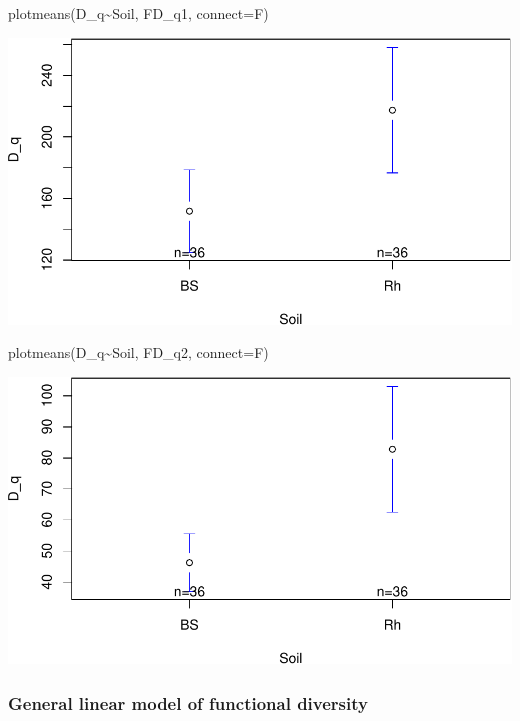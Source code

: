\documentclass[]{interact}
\theoremstyle{plain}%
\theoremstyle{definition}
\theoremstyle{remark}
\newenvironment{Shaded}{\begin{snugshade}}{\end{snugshade}}
\newcommand{\AttributeTok}[1]{\textcolor[rgb]{0.77,0.63,0.00}{#1}}
\newcommand{\FunctionTok}[1]{\textcolor[rgb]{0.00,0.00,0.00}{#1}}
\newcommand{\NormalTok}[1]{#1}
\newcommand{\SpecialCharTok}[1]{\textcolor[rgb]{0.00,0.00,0.00}{#1}}
\begin{document}
\begin{Shaded}
\begin{Highlighting}[]
\FunctionTok{plotmeans}\NormalTok{(D\_q}\SpecialCharTok{\textasciitilde{}}\NormalTok{Soil, FD\_q1, }\AttributeTok{connect=}\NormalTok{F)}
\end{Highlighting}
\end{Shaded}

\includegraphics{Doc_pdf_files/figure-latex/unnamed-chunk-12-7.pdf}

\begin{Shaded}
\begin{Highlighting}[]
\FunctionTok{plotmeans}\NormalTok{(D\_q}\SpecialCharTok{\textasciitilde{}}\NormalTok{Soil, FD\_q2, }\AttributeTok{connect=}\NormalTok{F)}
\end{Highlighting}
\end{Shaded}

\includegraphics{Doc_pdf_files/figure-latex/unnamed-chunk-12-8.pdf}

\hypertarget{general-linear-model-of-functional-diversity}{%
\subsubsection{General linear model of functional
diversity}\label{general-linear-model-of-functional-diversity}}
\end{document}
